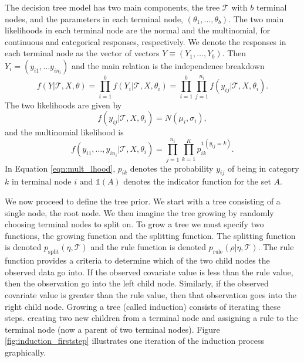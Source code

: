The decision tree model has two main components, the tree $\mathcal{T}$ with $b$ terminal nodes, and the parameters in each terminal node, $(\theta_1,\dots,\theta_b)$. 
The two main likelihoods in each terminal node are the normal and the multinomial, for continuous and categorical responses, respectively. 
We denote the responses in each terminal node as the vector  of vectors $Y\equiv (Y_1, \dots, Y_b)$. Then $Y_i = (y_{i1}, \dots y_{in_i})$ and the main relation is the independence breakdown 
\begin{equation}
f(Y\vert \mathcal{T}, X, \theta) =\prod_{i=1}^b f(Y_i\vert \mathcal{T}, X, \theta_i) = \prod_{i=1}^b \prod_{j=1}^{n_i} f(y_{ij} \vert \mathcal{T}, X, \theta_i).
\end{equation}
The two likelihoods are given by
\begin{equation}
f(y_{ij} \vert \mathcal{T}, X, \theta_i) = N(\mu_i,\sigma_i),
\end{equation}
and the multinomial likelihood is
\begin{equation}\label{eqn:mult_lhood}
f(y_{i1}, \dots ,y_{in_i} \vert \mathcal{T}, X, \theta_i) = \prod_{j=1}^{n_i}\prod_{k=1}^K p_{ik}^{\mathds{1}(y_{ij}=k)}.
\end{equation}
In Equation \ref{eqn:mult_lhood}, $p_{ik}$ denotes the probability $y_{ij}$ of being in category $k$ in terminal node $i$ and $\mathds{1}(A)$ denotes the indicator function for the set $A$. 

We now proceed to define the tree prior. We start with a tree consisting of a single node, the root node. We then imagine the tree growing by randomly choosing terminal nodes to split on. To grow a tree we must specify two functions, the growing function and the splitting function.  The splitting function is denoted $p_{\text{split}}(\eta, \mathcal{T})$ and the rule function is denoted $p_{\text{rule}}(\rho \vert \eta, \mathcal{T})$. The rule function provides a criteria to determine which of the two child nodes the observed data go into. If the observed covariate value is less than the rule value, then the observation go into the left child node. Similarly, if the observed covariate value is greater than the rule value, then that observation goes into the right child node. Growing a tree (called induction) consists of iterating these steps. creating two new children from a terminal node and assigning a rule to the terminal node (now a parent of two terminal nodes). Figure \ref{fig:induction_firststep} illustrates one iteration of the induction process graphically. 


